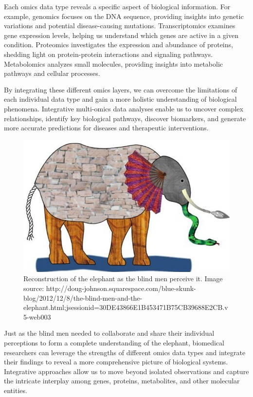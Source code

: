 \documentclass[a4paper, nobind]{templates/ociamthesis}
\begin{document}
Each omics data type reveals a specific aspect of biological information. For example, genomics focuses on the DNA sequence, providing insights into genetic variations and potential disease-causing mutations. Transcriptomics examines gene expression levels, helping us understand which genes are active in a given condition. Proteomics investigates the expression and abundance of proteins, shedding light on protein-protein interactions and signaling pathways. Metabolomics analyzes small molecules, providing insights into metabolic pathways and cellular processes.

By integrating these different omics layers, we can overcome the limitations of each individual data type and gain a more holistic understanding of biological phenomena. Integrative multi-omics data analyses enable us to uncover complex relationships, identify key biological pathways, discover biomarkers, and generate more accurate predictions for diseases and therapeutic interventions.

\begin{figure}

{\centering \includegraphics[width=0.95\linewidth]{figures/chapter1/1-2_elephant} 

}

\caption[Reconstruction of the elephant as the blind men perceive it]{Reconstruction of the elephant as the blind men perceive it. Image source: http://doug-johnson.squarespace.com/blue-skunk-blog/2012/12/8/the-blind-men-and-the-elephant.html;jsessionid=30DE43866E1B453471B75CB39688E2CB.v5-web003}\label{fig:fig1-2}
\end{figure}

Just as the blind men needed to collaborate and share their individual perceptions to form a complete understanding of the elephant, biomedical researchers can leverage the strengths of different omics data types and integrate their findings to reveal a more comprehensive picture of biological systems. Integrative approaches allow us to move beyond isolated observations and capture the intricate interplay among genes, proteins, metabolites, and other molecular entities.
\end{document}
